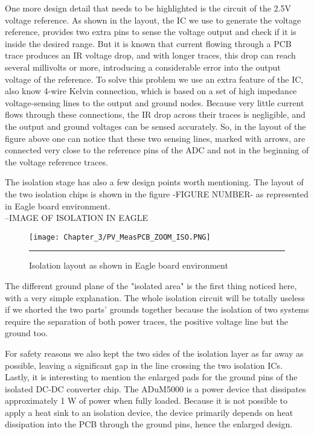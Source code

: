 One more design detail that needs to be highlighted is the circuit of the 2.5V voltage reference. As shown in the layout, the IC we use to generate the voltage reference, provides two extra pins to sense the voltage output and check if it is inside the desired range. But it is known that current flowing through a PCB trace produces an IR voltage drop, and with longer traces, this drop can reach several millivolts or more, introducing a considerable error into the output voltage of the reference. To solve this problem we use an extra feature of the IC, also know 4-wire Kelvin connection, which is based on a set of high impedance voltage-sensing lines to the output and ground nodes. Because very little current flows through these connections, the IR drop across their traces is negligible, and the output and ground voltages can be sensed accurately. So, in the layout of the figure above one can notice that these two sensing lines, marked with arrows, are connected very close to the reference pins of the ADC and not in the beginning of the voltage reference traces.

The isolation stage has also a few design points worth mentioning. The layout of the two isolation chips is shown in the figure -FIGURE NUMBER- as represented in Eagle board environment.\\

--IMAGE OF ISOLATION IN EAGLE\\
\begin{figure}[htbp]
	\centering
		\texttt{[image: Chapter\_3/PV\_MeasPCB\_ZOOM\_ISO.PNG]}
		\rule{35em}{0.5pt}
	\caption{Isolation layout as shown in Eagle board environment}
	\label{fig:PV_MeasPCB_ZOOM_ISO}
\end{figure}

The different ground plane of the "isolated area" is the first thing noticed here, with a very simple explanation. The whole isolation circuit will be totally useless if we shorted the two parts' grounds together because the isolation of two systems require the separation of both power traces, the positive voltage line but the ground too.

For safety reasons we also kept the two sides of the isolation layer as far away as possible, leaving a significant gap in the line crossing the two isolation ICs. Lastly, it is interesting to mention the enlarged pads for the ground pins of the isolated DC-DC converter chip. The ADuM5000 is a power device that dissipates approximately 1 W of power when fully loaded. Because it is not possible to apply a heat sink to an isolation device, the device primarily depends on heat dissipation into the PCB through the ground pins, hence the enlarged design.

